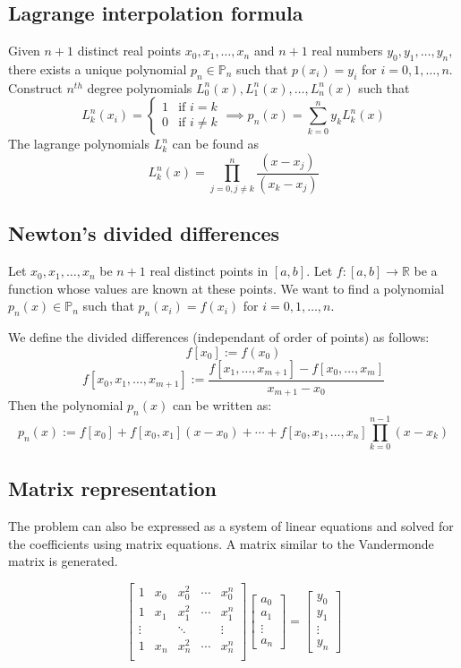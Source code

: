 \documentclass[11pt]{article}
\theoremstyle{definition}
\newcommand{\R}{\mathbb{R}}
\begin{document}
\subsection{Lagrange interpolation formula} 
Given $n+1$ distinct real points $x_0,x_1,\dots,x_n$ and $n+1$ real numbers $y_0,y_1,\dots,y_n$, there exists a unique polynomial $p_n\in\mathbb{P}_n$ such that $p(x_i)=y_i$ for $ i=0,1,\dots,n$. Construct $n^{th}$ degree polynomials $L_0^n(x),L_1^n(x),\dots,L_n^n(x)$ such that
$$L_k^n(x_i)=\left\lbrace\begin{array}{lr}
1 & \text{if } i=k\\
0 & \text{if } i\neq k
\end{array}\right.\implies \boxed{p_n(x)=\sum_{k=0}^ny_kL_k^n(x)}$$
The lagrange polynomials $L_k^n$ can be found as 
$$\boxed{L_k^n(x)=\prod_{j=0,j\neq k}^n\frac{(x-x_j)}{(x_k-x_j)}}$$

\subsection{Newton's divided differences}
Let $x_0,x_1,\dots,x_n$ be $n+1$ real distinct points in $[a,b].$ Let $f:[a,b]\to\R$ be a function whose values are known at these points. We want to find a polynomial $p_n(x)\in\mathbb{P}_n$ such that $p_n(x_i)=f(x_i)$ for $i=0,1,\dots,n$.

We define the divided differences (independant of order of points) as follows: $$f[x_0]:=f(x_0)$$$$
f[x_0,x_1,\dots,x_{m+1}]:=\frac{f[x_1,\dots,x_{m+1}]-f[x_0,\dots,x_m]}{x_{m+1}-x_0}$$
Then the polynomial $p_n(x)$ can be written as:
$$p_n(x) := f[x_0]  + f[x_0, x_1](x - x_0)+\cdots+f[x_0,x_1,\dots,x_n]\prod_{k=0}^{n-1}(x-x_k)$$

\subsection{Matrix representation}
The problem can also be expressed as a system of linear equations and solved for the coefficients using matrix equations. A matrix similar to the Vandermonde matrix is generated.

$$\begin{bmatrix}
1 & x_0 & x_0^2 & \cdots & x_0^n\\
1 & x_1 & x_1^2 & \cdots & x_1^n\\
\vdots & & \ddots & & \vdots\\
1 & x_n & x_n^2 & \cdots & x_n^n\\
\end{bmatrix}
\begin{bmatrix}
a_0\\
a_1\\
\vdots\\
a_n
\end{bmatrix}=
\begin{bmatrix}
y_0\\
y_1\\
\vdots\\
y_n
\end{bmatrix}
$$
\end{document}
